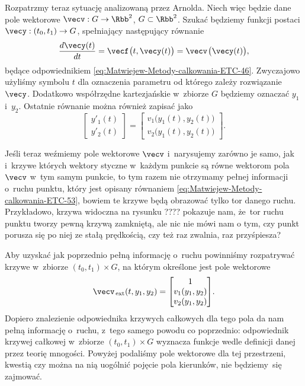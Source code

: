 \documentclass[a4paper,11pt]{article}
\numberwithin{equation}{section}
\begin{document}
Rozpatrzmy teraz sytuację analizowaną przez Arnolda. Niech więc będzie dane
pole wektorowe $\vecv : G \to \Rbb^{ 2 }$, $G \subset \Rbb^{ 2 }$. Szukać będziemy
funkcji postaci $\vecy : ( t_{ 0 }, t_{ 1 } ) \to G$, spełniający następujący
równanie
\begin{equation}
  \label{eq:Uwagi-do-konkrentych-stron-35}
  \frac{ d \vecy( t ) }{ dt } =
  \vecf \HorSpaceOne \big( t, \vecy( t ) \big) =
  \vecv \HorSpaceThree \big( \vecy( t ) \big),
\end{equation}
będące odpowiednikiem \eqref{eq:Matwiejew-Metody-calkowania-ETC-46}.
Zwyczajowo użyliśmy symbolu $t$ dla oznaczenia parametru od którego zależy
rozwiązanie $\vecy$. Dodatkowo współrzędne kartezjańskie w~zbiorze $G$
będziemy oznaczać $y_{ 1 }$ i~$y_{ 2 }$. Ostatnie równanie można
również zapisać jako
\begin{equation}
  \label{eq:Uwagi-do-konkrentych-stron-36}
  \begin{bmatrix}
    y'_{ 1 }( t ) \\
    y'_{ 2 }( t )
  \end{bmatrix} =
  \begin{bmatrix}
    v_{ 1 }\big( y_{ 1 }( t ), y_{ 2 }( t ) \big) \\
    v_{ 2 }\big( y_{ 1 }( t ), y_{ 2 }( t ) \big)
  \end{bmatrix}\!.
\end{equation}

Jeśli teraz weźmiemy pole wektorowe $\vecv$ i~narysujemy zarówno je samo,
jak i~krzywe których wektory styczne w~każdym punkcie są równe wektorom
pola $\vecv$ w~tym samym punkcie, to tym razem nie otrzymamy pełnej
informacji o~ruchu punktu, który jest opisany równaniem
\eqref{eq:Matwiejew-Metody-calkowania-ETC-53}, bowiem te krzywe będą
obrazować tylko tor danego ruchu. Przykładowo, krzywa widoczna na rysunku
????
pokazuje nam, że~tor ruchu punktu tworzy pewną krzywą zamkniętą, ale nic
nie mówi nam o tym, czy punkt porusza się po niej ze stałą prędkością,
czy też raz zwalnia, raz przyśpiesza?

Aby uzyskać jak poprzednio pełną informację o~ruchu powinniśmy rozpatrywać
krzywe w~zbiorze $( t_{ 0 }, t_{ 1 } ) \times G$, na którym określone jest pole
wektorowe
\begin{equation}
  \label{eq:Uwagi-do-konkrentych-stron-37}
  \vecv_{ \, \textrm{ext} }( t, y_{ 1 }, y_{ 2 } ) =
  \begin{bmatrix}
    1 \\
    v_{ 1 }( y_{ 1 }, y_{ 2 } ) \\
    v_{ 2 }( y_{ 1 }, y_{ 2 } )
  \end{bmatrix}\!.
\end{equation}
Dopiero znalezienie odpowiednika krzywych całkowych dla tego pola da nam
pełną informację o~ruchu, z~tego samego powodu co poprzednio: odpowiednik
krzywej całkowej w~zbiorze $( t_{ 0 }, t_{ 1 } ) \times G$ wyznacza funkcje
wedle definicji danej przez teorię mnogości. Powyżej podaliśmy pole
wektorowe dla tej przestrzeni, kwestią czy można na nią uogólnić pojęcie
pola kierunków, nie będziemy~się zajmować.
\end{document}

